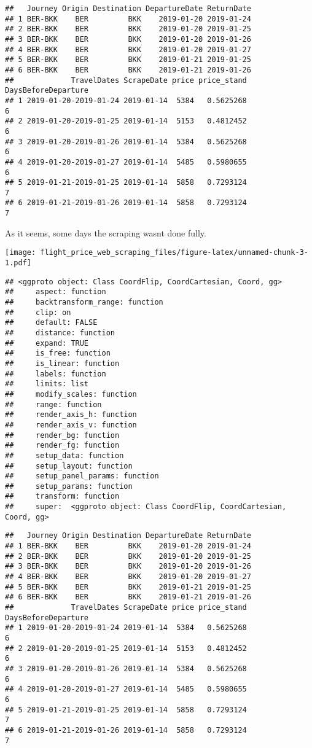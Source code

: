 \documentclass[]{article}
\begin{document}
\begin{verbatim}
##   Journey Origin Destination DepartureDate ReturnDate
## 1 BER-BKK    BER         BKK    2019-01-20 2019-01-24
## 2 BER-BKK    BER         BKK    2019-01-20 2019-01-25
## 3 BER-BKK    BER         BKK    2019-01-20 2019-01-26
## 4 BER-BKK    BER         BKK    2019-01-20 2019-01-27
## 5 BER-BKK    BER         BKK    2019-01-21 2019-01-25
## 6 BER-BKK    BER         BKK    2019-01-21 2019-01-26
##             TravelDates ScrapeDate price price_stand DaysBeforeDeparture
## 1 2019-01-20-2019-01-24 2019-01-14  5384   0.5625268                   6
## 2 2019-01-20-2019-01-25 2019-01-14  5153   0.4812452                   6
## 3 2019-01-20-2019-01-26 2019-01-14  5384   0.5625268                   6
## 4 2019-01-20-2019-01-27 2019-01-14  5485   0.5980655                   6
## 5 2019-01-21-2019-01-25 2019-01-14  5858   0.7293124                   7
## 6 2019-01-21-2019-01-26 2019-01-14  5858   0.7293124                   7
\end{verbatim}

As it seems, some days the scraping wasnt done fully.

\texttt{[image: flight\_price\_web\_scraping\_files/figure-latex/unnamed-chunk-3-1.pdf]}

\begin{verbatim}
## <ggproto object: Class CoordFlip, CoordCartesian, Coord, gg>
##     aspect: function
##     backtransform_range: function
##     clip: on
##     default: FALSE
##     distance: function
##     expand: TRUE
##     is_free: function
##     is_linear: function
##     labels: function
##     limits: list
##     modify_scales: function
##     range: function
##     render_axis_h: function
##     render_axis_v: function
##     render_bg: function
##     render_fg: function
##     setup_data: function
##     setup_layout: function
##     setup_panel_params: function
##     setup_params: function
##     transform: function
##     super:  <ggproto object: Class CoordFlip, CoordCartesian, Coord, gg>
\end{verbatim}

\begin{verbatim}
##   Journey Origin Destination DepartureDate ReturnDate
## 1 BER-BKK    BER         BKK    2019-01-20 2019-01-24
## 2 BER-BKK    BER         BKK    2019-01-20 2019-01-25
## 3 BER-BKK    BER         BKK    2019-01-20 2019-01-26
## 4 BER-BKK    BER         BKK    2019-01-20 2019-01-27
## 5 BER-BKK    BER         BKK    2019-01-21 2019-01-25
## 6 BER-BKK    BER         BKK    2019-01-21 2019-01-26
##             TravelDates ScrapeDate price price_stand DaysBeforeDeparture
## 1 2019-01-20-2019-01-24 2019-01-14  5384   0.5625268                   6
## 2 2019-01-20-2019-01-25 2019-01-14  5153   0.4812452                   6
## 3 2019-01-20-2019-01-26 2019-01-14  5384   0.5625268                   6
## 4 2019-01-20-2019-01-27 2019-01-14  5485   0.5980655                   6
## 5 2019-01-21-2019-01-25 2019-01-14  5858   0.7293124                   7
## 6 2019-01-21-2019-01-26 2019-01-14  5858   0.7293124                   7
\end{verbatim}
\end{document}
